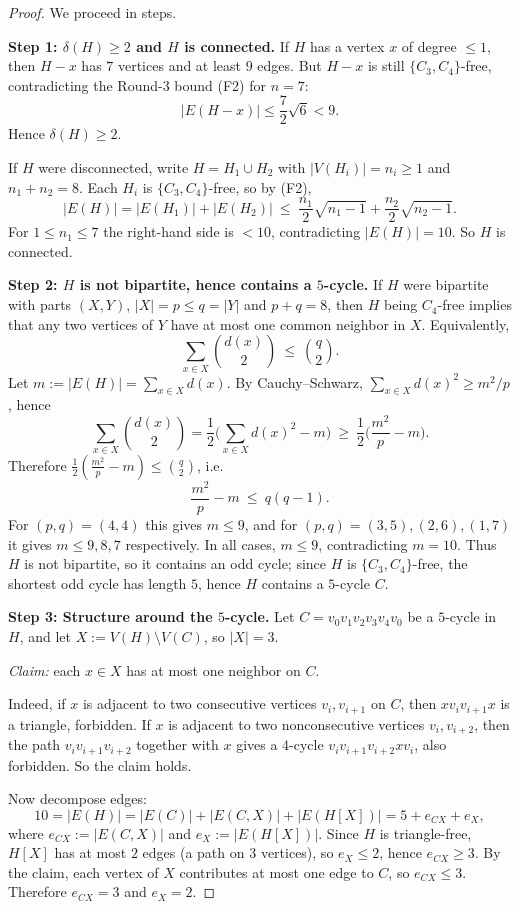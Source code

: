 \begin{proof}
We proceed in steps.

\medskip
\noindent\textbf{Step 1: $\delta(H)\ge 2$ and $H$ is connected.}
If $H$ has a vertex $x$ of degree $\le 1$, then $H-x$ has $7$ vertices and at least $9$ edges.
But $H-x$ is still $\{C_3,C_4\}$-free, contradicting the Round-3 bound (F2) for $n=7$:
\[
|E(H-x)|\le \frac72\sqrt6<9.
\]
Hence $\delta(H)\ge 2$.

If $H$ were disconnected, write $H=H_1\cup H_2$ with $|V(H_i)|=n_i\ge 1$ and $n_1+n_2=8$.
Each $H_i$ is $\{C_3,C_4\}$-free, so by (F2),
\[
|E(H)|=|E(H_1)|+|E(H_2)|\ \le\ \frac{n_1}{2}\sqrt{n_1-1}+\frac{n_2}{2}\sqrt{n_2-1}.
\]
For $1\le n_1\le 7$ the right-hand side is $<10$, contradicting $|E(H)|=10$.
So $H$ is connected.

\medskip
\noindent\textbf{Step 2: $H$ is not bipartite, hence contains a $5$-cycle.}
If $H$ were bipartite with parts $(X,Y)$, $|X|=p\le q=|Y|$ and $p+q=8$, then $H$ being $C_4$-free implies that any two vertices of $Y$ have at most one common neighbor in $X$.
Equivalently,
\[
\sum_{x\in X}\binom{d(x)}2 \ \le\ \binom{q}{2}.
\]
Let $m:=|E(H)|=\sum_{x\in X}d(x)$.
By Cauchy--Schwarz, $\sum_{x\in X}d(x)^2\ge m^2/p$, hence
\[
\sum_{x\in X}\binom{d(x)}2 = \frac12\Big(\sum_{x\in X}d(x)^2 - m\Big)\ \ge\ \frac12\Big(\frac{m^2}{p}-m\Big).
\]
Therefore $\frac12(\frac{m^2}{p}-m)\le \binom q2$, i.e.
\[
\frac{m^2}{p}-m \ \le\ q(q-1).
\]
For $(p,q)=(4,4)$ this gives $m\le 9$, and for $(p,q)=(3,5),(2,6),(1,7)$ it gives $m\le 9,8,7$ respectively.
In all cases, $m\le 9$, contradicting $m=10$.
Thus $H$ is not bipartite, so it contains an odd cycle; since $H$ is $\{C_3,C_4\}$-free, the shortest odd cycle has length $5$, hence $H$ contains a $5$-cycle $C$.

\medskip
\noindent\textbf{Step 3: Structure around the $5$-cycle.}
Let $C=v_0v_1v_2v_3v_4v_0$ be a $5$-cycle in $H$, and let $X:=V(H)\setminus V(C)$, so $|X|=3$.

\emph{Claim:} each $x\in X$ has at most one neighbor on $C$.

Indeed, if $x$ is adjacent to two consecutive vertices $v_i,v_{i+1}$ on $C$, then $xv_iv_{i+1}x$ is a triangle, forbidden.
If $x$ is adjacent to two nonconsecutive vertices $v_i,v_{i+2}$, then the path $v_i v_{i+1} v_{i+2}$ together with $x$ gives a $4$-cycle $v_i v_{i+1} v_{i+2} x v_i$, also forbidden.
So the claim holds.

Now decompose edges:
\[
10=|E(H)|=|E(C)| + |E(C,X)| + |E(H[X])| = 5 + e_{CX} + e_X,
\]
where $e_{CX}:=|E(C,X)|$ and $e_X:=|E(H[X])|$.
Since $H$ is triangle-free, $H[X]$ has at most $2$ edges (a path on $3$ vertices), so $e_X\le 2$, hence $e_{CX}\ge 3$.
By the claim, each vertex of $X$ contributes at most one edge to $C$, so $e_{CX}\le 3$.
Therefore $e_{CX}=3$ and $e_X=2$.


\end{proof}
